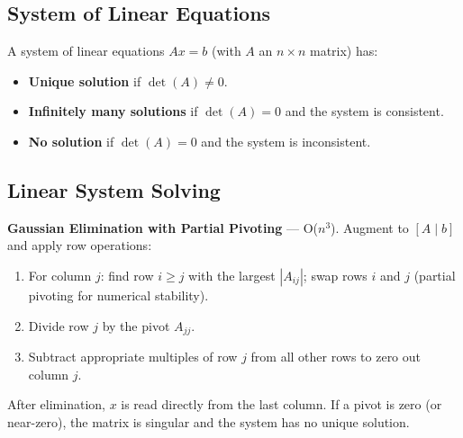 \subsection{System of Linear Equations}

A system of linear equations $Ax = b$ (with $A$ an $n \times n$ matrix) has:
\begin{itemize}
    \item \textbf{Unique solution} if $\det(A) \neq 0$.
    \item \textbf{Infinitely many solutions} if $\det(A) = 0$ and the system is consistent.
    \item \textbf{No solution} if $\det(A) = 0$ and the system is inconsistent.
\end{itemize}

\subsection{Linear System Solving}

\textbf{Gaussian Elimination with Partial Pivoting} — O($n^3$). Augment to $[A \mid b]$ and apply row operations:
\begin{enumerate}
    \item For column $j$: find row $i \geq j$ with the largest $|A_{ij}|$; swap rows $i$ and $j$ (partial pivoting for numerical stability).
    \item Divide row $j$ by the pivot $A_{jj}$.
    \item Subtract appropriate multiples of row $j$ from all other rows to zero out column $j$.
\end{enumerate}
After elimination, $x$ is read directly from the last column. If a pivot is zero (or near-zero), the matrix is singular and the system has no unique solution.
